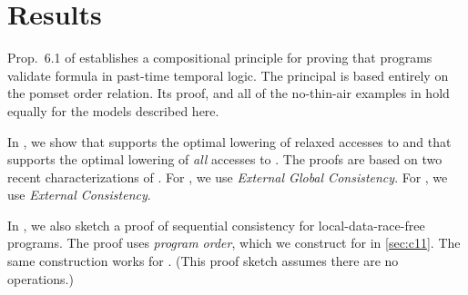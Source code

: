 \section{\PwTmcaTITLE{} Results}
\label{sec:results}

Prop.~6.1 of \cite{DBLP:journals/pacmpl/JagadeesanJR20} establishes a
compositional principle for proving that programs validate formula in
past-time temporal logic.  The principal is based entirely on the pomset
order relation.  Its proof, and all of the no-thin-air examples in
\cite[]{DBLP:journals/pacmpl/JagadeesanJR20} hold equally for
the models described here.


In , we show that  supports the optimal
lowering of relaxed accesses to \armeight{} and that  supports the
optimal lowering of \emph{all} accesses to \armeight{}.  The proofs are based
on two recent characterizations of \armeight{} \cite{armed}.  For ,
we use \emph{External Global Consistency}.  For , we use
\emph{External Consistency}.

In , we also sketch a proof of sequential consistency for
local-data-race-free programs.  The proof uses \emph{program order}, which we
construct for \cXI{} in \textsection\ref{sec:c11}.  The same construction
works for \PwTmca{}.  (This proof sketch assumes there are no \RMW{} operations.)

